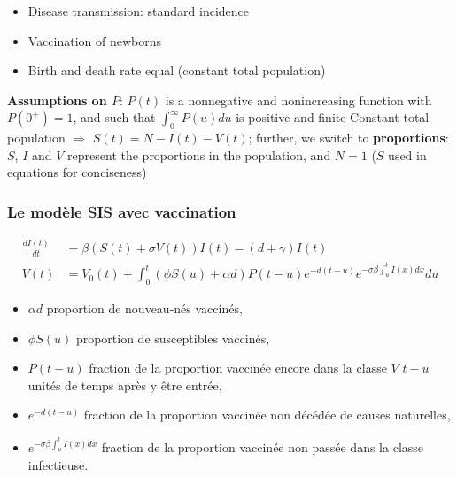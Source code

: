 \documentclass[aspectratio=169]{beamer}\usepackage[]{graphicx}\usepackage[]{xcolor}
\begin{document}
\begin{frame}\frametitle{}
\begin{itemize}
\item Disease transmission: standard incidence
\vfill
\item Vaccination of newborns
\vfill
\item Birth and death rate equal (\imply constant total population)
\end{itemize}

\textbf{Assumptions on $P$}: $P(t)$ is a nonnegative and nonincreasing
function with $P(0^+)=1$, and such that $\int_0^\infty P(u)du$ is
positive and finite
\vfill
Constant total population $\Rightarrow$ $S(t)=N-I(t)-V(t)$; further, we
switch to \textbf{proportions}: $S$, $I$ and $V$ represent the
proportions in the population, and $N=1$ ($S$ used in equations for
conciseness)
\end{frame}

\begin{frame}\frametitle{Le modèle SIS avec vaccination} 
\begin{subequations}\label{sys:SIVS_general}
\begin{align}
  \frac{dI(t)}{dt}&= \beta(S(t)+\sigma V(t))I(t)-(d+\gamma)I(t)
  \label{sys:SIVS_general_I}\\ 
  V(t)&= V_0(t) 
  +\int_0^t(\phi S(u)+\alpha d)P(t-u)e^{-d(t-u)}
  e^{-\sigma\beta\int_u^tI(x)dx}du \label{sys:SIVS_general_V}
\end{align}
\end{subequations}
\vfill
\begin{itemize}
\item $\alpha d$ proportion de nouveau-nés vaccinés,
\item $\phi S(u)$ proportion de susceptibles vaccinés, 
\item $P(t-u)$ fraction de la proportion vaccinée encore dans la classe $V$
  $t-u$ unités de temps après y être entrée,
\item $e^{-d(t-u)}$ fraction de la proportion vaccinée
non décédée de causes naturelles,
\item $e^{-\sigma\beta\int_u^t I(x)dx}$ fraction de la proportion
  vaccinée non passée dans la classe infectieuse.
\end{itemize} 
\end{frame}
\end{document}
